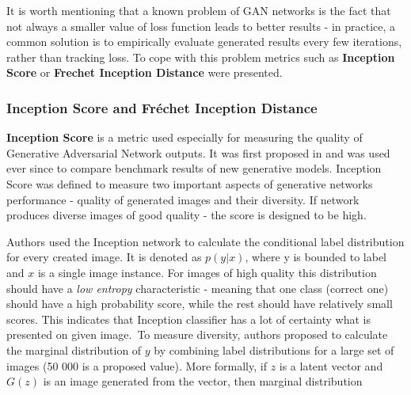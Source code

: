 \documentclass[12pt,a4paper,openany]{book}
\begin{document}
\noindent It is worth mentioning that a known problem of GAN networks is the fact that not always a smaller value of loss function leads to better results - in practice, a common solution is to empirically evaluate generated results every few iterations, rather than tracking loss. To cope with this problem metrics such as \textbf{Inception Score} or \textbf{Frechet Inception Distance} were presented. 

\subsubsection*{Inception Score and Fr\'echet Inception Distance}



\noindent \textbf{Inception Score} is a metric used especially for measuring the quality of Generative Adversarial Network outputs. It was first proposed in \cite{improvedgans} and was used ever since to compare benchmark results of new generative models. Inception Score was defined to measure two important aspects of generative networks performance - quality of generated images and their diversity. If network produces diverse images of good quality - the score is designed to be high.\


\noindent Authors used the Inception network \cite{inception} to calculate the conditional label distribution for every created image. It is denoted as $p(y|x)$, where y is bounded to label and $x$ is a single image instance. For images of high quality this distribution should have a \textit{low entropy} characteristic - meaning that one class (correct one) should have a high probability score, while the rest should have relatively small scores. This indicates that Inception classifier has a lot of certainty what is presented on given image.\ 
To measure diversity, authors proposed to calculate the marginal distribution of $y$ by combining label distributions for a large set of images (50 000 is a proposed value). More formally, if $z$ is a latent vector and $G(z)$ is an image generated from the vector, then marginal distribution 
\end{document}
